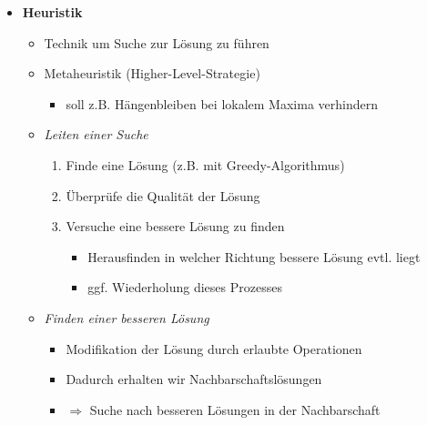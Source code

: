 \begin{itemize}
        \item \textbf{Heuristik}
            \begin{itemize}
                \item Technik um Suche zur Lösung zu führen
                \item Metaheuristik (Higher-Level-Strategie)
                    \begin{itemize}
                        \item soll z.B. Hängenbleiben bei lokalem Maxima verhindern
                    \end{itemize}
                \item \textit{Leiten einer Suche}
                    \begin{enumerate}
                        \item Finde eine Lösung (z.B. mit Greedy-Algorithmus)
                        \item Überprüfe die Qualität der Lösung
                        \item Versuche eine bessere Lösung zu finden
                            \begin{itemize}
                                \item Herausfinden in welcher Richtung bessere Lösung evtl. liegt
                                \item ggf. Wiederholung dieses Prozesses
                            \end{itemize}
                    \end{enumerate}
                \item \textit{Finden einer besseren Lösung}
                    \begin{itemize}
                        \item Modifikation der Lösung durch erlaubte Operationen
                        \item Dadurch erhalten wir Nachbarschaftslösungen
                        \item[] $\Rightarrow$ Suche nach besseren Lösungen in der Nachbarschaft
                    \end{itemize}
            \end{itemize}
        

\end{itemize}
